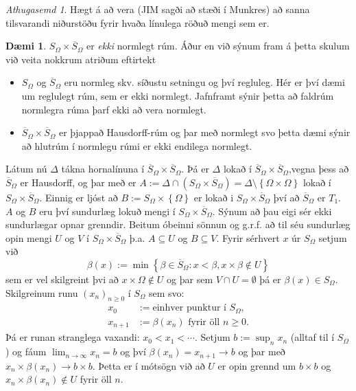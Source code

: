 \documentclass[a4paper,icelandic]{book}
\theoremstyle{definition}
\newtheorem{daemi}{Dæmi}[section]
\theoremstyle{plain}
\theoremstyle{remark}
\newtheorem*{ath}{Athugasemd}
\begin{document}
\begin{ath}
  Hægt á að vera (JIM sagði að stæði í Munkres) að sanna tilsvarandi
  niðurstöðu fyrir hvaða línulega röðuð mengi sem er.
\end{ath}
\begin{daemi}
  $S_\Omega\times \overline S_\Omega$ er \emph{ekki} normlegt rúm. Áður
  en við sýnum fram á þetta skulum við veita nokkrum atriðum eftirtekt
  \begin{itemize}
    \item $S_\Omega$ og $\overline S_\Omega$ eru normleg skv. síðustu
      setningu og því regluleg. Hér er því dæmi um reglulegt rúm, sem er
      ekki normlegt. Jafnframt sýnir þetta að faldrúm normlegra rúma
      þarf ekki að vera normlegt.
    \item $\overline S_\Omega\times\overline S_\Omega$ er þjappað
      Hausdorff-rúm og þar með normlegt svo þetta dæmi sýnir að hlutrúm
      í normlegu rúmi er ekki endilega normlegt.
  \end{itemize}
  Látum nú $\Delta$ tákna hornalínuna í $\overline
  S_\Omega\times\overline S_\Omega$. Þá er $\Delta$ lokað í $\overline
  S_\Omega\times \overline S_\Omega$,vegna þess að $\overline S_\Omega$
  er Hausdorff, og þar með er $A := \Delta\cap(S_\Omega\times\overline
  S_\Omega)=\Delta\setminus\left\{ \Omega\times\Omega \right\}$ lokað í
  $S_\Omega\times\overline S_\Omega$. Einnig er ljóst að $B := S_\Omega
  \times\left\{ \Omega \right\}$ er lokað i $S_\Omega\times\overline
  S_\Omega$ því að $\overline S_\Omega$ er $T_1$. $A$ og $B$
  eru því sundurlæg lokuð mengi í $S_\Omega\times\overline S_\Omega$.
  Sýnum að þau eigi sér ekki sundurlægar opnar grenndir. Beitum óbeinni
  sönnun og g.r.f. að til séu sundurlæg opin mengi $U$ og $V$ í
  $S_\Omega\times\overline S_\Omega$ þ.a. $A\subseteq U$ og $B\subseteq
  V$. Fyrir sérhvert $x$ úr $S_\Omega$ setjum við\[
  \beta(x) := 
  \min\left\{ 
    \beta\in \overline S_\Omega : x<\beta,x\times\beta\notin U
  \right\}
  \]
  sem er vel skilgreint þvi að $x\times\Omega\notin U$ og þar sem $V\cap
  U = \emptyset$ þá er $\beta(x)\in S_\Omega$. Skilgreinum runu
  $(x_n)_{n\geq 0}$ í $S_\Omega$ sem svo:
  \begin{align*}
    x_0     &:= \text{einhver punktur í } S_\Omega, \\
    x_{n+1} &:= \beta(x_n) \text{ fyrir öll } n\geq 0.
  \end{align*}
  Þá er runan stranglega vaxandi: $x_0<x_1<\cdots$. Setjum
  $b:=\sup_{n}x_n$ (alltaf til í $S_\Omega$) og fáum
  $\lim_{n\to\infty}x_n = b$ og því $\beta(x_n) = x_{n+1}\longrightarrow
  b$ og þar með $x_n\times\beta(x_n)\longrightarrow b\times b$. Þetta er
  í mótsögn við að $U$ er opin grennd um $b\times b$ og $x_n \times
  \beta(x_n)\notin U$ fyrir öll $n$. 
\end{daemi}
\end{document}
